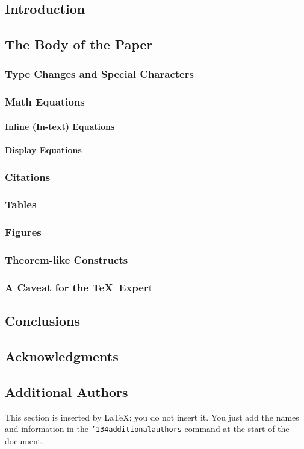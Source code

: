 \documentclass{nime-alternate}
\begin{document}
\subsection{Introduction}
\subsection{The Body of the Paper}
\subsubsection{Type Changes and  Special Characters}
\subsubsection{Math Equations}
\paragraph{Inline (In-text) Equations}
\paragraph{Display Equations}
\subsubsection{Citations}
\subsubsection{Tables}
\subsubsection{Figures}
\subsubsection{Theorem-like Constructs}
\subsubsection*{A Caveat for the \TeX\ Expert}
\subsection{Conclusions}
\subsection{Acknowledgments}
\subsection{Additional Authors}
This section is inserted by \LaTeX; you do not insert it.
You just add the names and information in the
\texttt{{\char'134}additionalauthors} command at the start
of the document.
\end{document}
